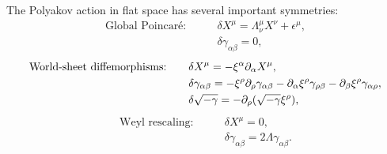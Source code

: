The Polyakov action in flat space has several important symmetries: 
\begin{align}
    \text{Global Poincaré:}\qquad &\delta X^\mu = \Lambda^\mu_\nu X^\nu+\epsilon^\mu,\\
    &\delta \gamma_{\alpha\beta} = 0,
\end{align}
\begin{align}
    \text{World-sheet diffemorphisms:}\qquad &\delta X^\mu = -\xi^\alpha\partial_\alpha X^\mu,\\
    &\delta \gamma_{\alpha\beta} = -\xi^\rho\partial_\rho \gamma_{\alpha\beta}-\partial_\alpha \xi^\rho \gamma_{\rho\beta}-\partial_\beta \xi^\rho \gamma_{\alpha\rho},\\
    &\delta\sqrt{-\gamma} = -\partial_\rho(\sqrt{-\gamma}\xi^\rho),
\end{align}
\begin{align}
    \text{Weyl rescaling:}\qquad &\delta X^\mu = 0,\\
    & \delta \gamma_{\alpha\beta} = 2\Lambda \gamma_{\alpha\beta}.
\end{align}

